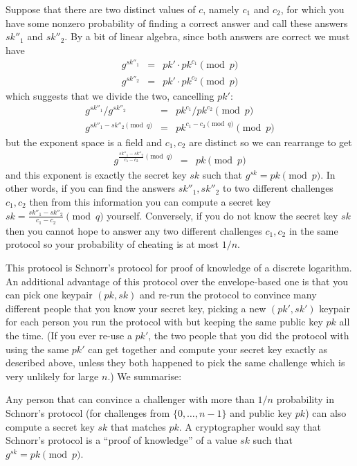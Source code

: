 \documentclass{llncs}
\begin{document}
Suppose that there are two distinct values of $c$, namely $c_1$ and $c_2$, for
which you have some nonzero probability of finding a correct answer and call
these answers $sk''_1$ and $sk''_2$. By a bit of linear algebra, since both
answers are correct we must have
\begin{eqnarray}
g^{sk''_1} & = & pk' \cdot pk^{c_1} \pmod{p} \\
g^{sk''_2} & = & pk' \cdot pk^{c_2} \pmod{p}
\end{eqnarray}
which suggests that we divide the two, cancelling $pk'$:
\begin{eqnarray}
g^{sk''_1} / g^{sk''_2} & = & pk^{c_1} / pk^{c_2} \pmod{p} \\
g^{sk''_1 - sk''_2 \pmod{q}} & = & pk^{c_1 - c_2 \pmod{q}} \pmod{p}
\end{eqnarray}
but the exponent space is a field and $c_1, c_2$ are distinct so we can
rearrange to get
\begin{eqnarray}
g^{\frac{sk''_1 - sk''_2}{c_1 - c_2}\pmod{q}} & = & pk \pmod{p}
\end{eqnarray}
and this exponent is exactly the secret key $sk$ such that $g^{sk} = pk
\pmod{p}$.
In other words, if you can find the answers $sk''_1, sk''_2$ to two different
challenges $c_1, c_2$ then from this information you can compute a secret key
$sk = \frac{sk''_1 - sk''_2}{c_1 - c_2}\pmod{q}$ yourself. Conversely, if you
do not know the secret key $sk$ then you cannot hope to answer any two different
challenges $c_1, c_2$ in the same protocol so your probability of cheating is at
most $1/n$.

This protocol is Schnorr's protocol \cite{S91} for proof of knowledge of a
discrete logarithm. An additional advantage of this protocol over the
envelope-based one is that you can pick one keypair $(pk, sk)$ and re-run the
protocol to convince many different people that you know your secret key,
picking a new $(pk', sk')$ keypair for each person you run the protocol with but
keeping the same public key $pk$ all the time. (If you ever re-use a $pk'$, the
two people that you did the protocol with using the same $pk'$ can get together
and compute your secret key exactly as described above, unless they both
happened to pick the same challenge which is very unlikely for large $n$.) We
summarise:

\begin{proposition}
Any person that can convince a challenger with more than $1/n$ probability in
Schnorr's protocol (for challenges from $\{0, \ldots, n-1\}$ and public key
$pk$) can also compute a secret key $sk$ that matches $pk$. A cryptographer
would say that Schnorr's protocol is a ``proof of knowledge'' of a value $sk$
such that $g^{sk} = pk \pmod{p}$.
\end{proposition}
\end{document}
